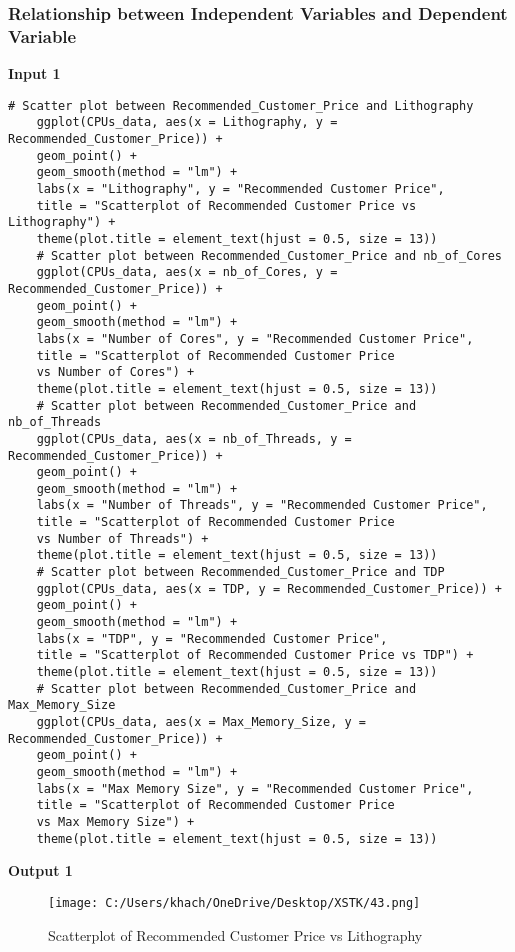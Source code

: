 \documentclass[a4paper]{article}
\begin{document}
	\subsubsection{Relationship between Independent Variables and Dependent Variable}
	\textbf{Input 1}
	\begin{lstlisting}[frame=single, backgroundcolor=\color{gray!10}, breaklines=true, columns=fullflexible]
	# Scatter plot between Recommended_Customer_Price and Lithography
	ggplot(CPUs_data, aes(x = Lithography, y = Recommended_Customer_Price)) +
	geom_point() +
	geom_smooth(method = "lm") +
	labs(x = "Lithography", y = "Recommended Customer Price", 
	title = "Scatterplot of Recommended Customer Price vs Lithography") +
	theme(plot.title = element_text(hjust = 0.5, size = 13))
	# Scatter plot between Recommended_Customer_Price and nb_of_Cores
	ggplot(CPUs_data, aes(x = nb_of_Cores, y = Recommended_Customer_Price)) +
	geom_point() +
	geom_smooth(method = "lm") +
	labs(x = "Number of Cores", y = "Recommended Customer Price", 
	title = "Scatterplot of Recommended Customer Price 
	vs Number of Cores") +
	theme(plot.title = element_text(hjust = 0.5, size = 13))
	# Scatter plot between Recommended_Customer_Price and nb_of_Threads
	ggplot(CPUs_data, aes(x = nb_of_Threads, y = Recommended_Customer_Price)) +
	geom_point() +
	geom_smooth(method = "lm") +
	labs(x = "Number of Threads", y = "Recommended Customer Price", 
	title = "Scatterplot of Recommended Customer Price 
	vs Number of Threads") +
	theme(plot.title = element_text(hjust = 0.5, size = 13))
	# Scatter plot between Recommended_Customer_Price and TDP
	ggplot(CPUs_data, aes(x = TDP, y = Recommended_Customer_Price)) +
	geom_point() +
	geom_smooth(method = "lm") +
	labs(x = "TDP", y = "Recommended Customer Price", 
	title = "Scatterplot of Recommended Customer Price vs TDP") +
	theme(plot.title = element_text(hjust = 0.5, size = 13))
	# Scatter plot between Recommended_Customer_Price and Max_Memory_Size
	ggplot(CPUs_data, aes(x = Max_Memory_Size, y = Recommended_Customer_Price)) +
	geom_point() +
	geom_smooth(method = "lm") +
	labs(x = "Max Memory Size", y = "Recommended Customer Price", 
	title = "Scatterplot of Recommended Customer Price 
	vs Max Memory Size") +
	theme(plot.title = element_text(hjust = 0.5, size = 13))
	\end{lstlisting}
	\textbf{Output 1}
	\begin{figure}[htbp]
		\centering
		\begin{adjustbox}{width=0.5\textwidth, frame}
			\texttt{[image: C:/Users/khach/OneDrive/Desktop/XSTK/43.png]}
		\end{adjustbox}
		\captionsetup{justification=centering}
		\vspace{0.5cm}
		\caption{Scatterplot of Recommended Customer Price vs Lithography}
	\end{figure}
\end{document}
